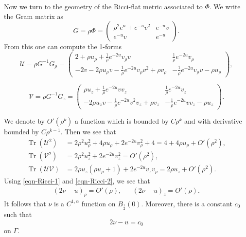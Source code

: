 \documentclass[a4paper,11pt]{amsart}
\theoremstyle{definition}
\numberwithin{equation}{section}
\DeclareMathOperator{\Tr}{Tr}
\begin{document}
Now we turn to the geometry of the  Ricci-flat metric associated to $\Phi$.  We write the Gram matrix as
$$G=\rho\Phi=\left(\begin{matrix}
	\rho^2e^u+e^{-u}v^2&e^{-u}v\\
	e^{-u}v&e^{-u}
\end{matrix}\right).$$
From this one can compute the 1-forms \begin{equation}\label{eq:U}
	\mathcal{U}=\rho G^{-1} G_\rho=\left(\begin{matrix}
		2+\rho u_\rho+\frac{1}{\rho}e^{-2u}v_\rho v & \frac{1}{\rho}e^{-2u}v_\rho\\ 
		-2v-2\rho u_\rho v-\frac{1}{\rho}e^{-2u}v_\rho v^2+\rho v_\rho &-\frac{1}{\rho}e^{-2u}v_\rho v-\rho u_\rho
	\end{matrix}\right),
\end{equation}

\begin{equation}\label{eq:V}
	\mathcal{V}=\rho G^{-1}G_z=\left(\begin{matrix}
		\rho u_z+\frac{1}{\rho}e^{-2u}vv_z & \frac{1}{\rho}e^{-2u}v_z\\
		-2\rho u_zv-\frac{1}{\rho}e^{-2u}v^2v_z+\rho v_z & -\frac{1}{\rho}e^{-2u}vv_z-\rho u_z
	\end{matrix}\right).
\end{equation}



We denote by $O'(\rho^k)$ a function which is bounded by $C\rho^k$ and with derivative bounded by $C\rho^{k-1}$. Then we see that
\begin{align*}
	\Tr(\mathcal{U}^2)&=2 \rho^2 u_\rho^2+4 \rho u_\rho+2 e^{-2 u} v_\rho^2+4=4+4\rho u_\rho+O'(\rho^2),\\
    \Tr(\mathcal{V}^2)&=2 \rho^2 u_z^2+2 e^{-2 u} v_z^2=O'(\rho^2),\\
	\Tr(\mathcal{U}\mathcal{V})&=2 \rho u_z \left(\rho u_\rho+1\right)+2 e^{-2 u} v_z v_\rho=2\rho u_z+O'(\rho^2).
\end{align*}
Using \eqref{eqn-Ricci-1} and \eqref{eqn-Ricci-2}, we see that
\begin{align}
    (2\nu-u)_\rho=O'(\rho),&& (2\nu-u)_z=O'(\rho). \label{eqn:nu}	
\end{align}
It follows that $\nu$ is a $C^{1,\alpha}$ function on $B_{\frac{1}{2}}(0)$. 
Moreover, there is a constant $c_0$ such that $$2\nu-u=c_0$$  on $\Gamma$. 
 
\end{document}

